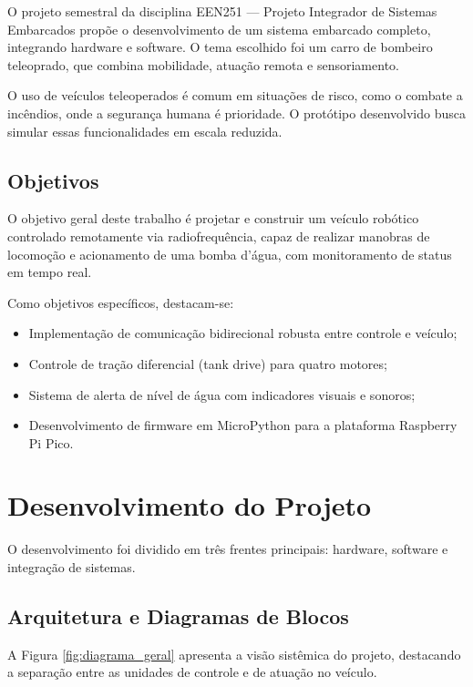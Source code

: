 \documentclass[
	12pt,				
	openright,			
	oneside,			
	a4paper,			
	english,			
	brazilian			
	]{abntex2}
\begin{document}
O projeto semestral da disciplina EEN251 --- Projeto Integrador de Sistemas Embarcados propõe o desenvolvimento de um sistema embarcado completo, integrando hardware e software. O tema escolhido foi um carro de bombeiro teleoprado, que combina mobilidade, atuação remota e sensoriamento.

O uso de veículos teleoperados é comum em situações de risco, como o combate a incêndios, onde a segurança humana é prioridade. O protótipo desenvolvido busca simular essas funcionalidades em escala reduzida.

\section{Objetivos}

O objetivo geral deste trabalho é projetar e construir um veículo robótico controlado remotamente via radiofrequência, capaz de realizar manobras de locomoção e acionamento de uma bomba d'água, com monitoramento de status em tempo real.

Como objetivos específicos, destacam-se:
\begin{itemize}
    \item Implementação de comunicação bidirecional robusta entre controle e veículo;
    \item Controle de tração diferencial (tank drive) para quatro motores;
    \item Sistema de alerta de nível de água com indicadores visuais e sonoros;
    \item Desenvolvimento de firmware em MicroPython para a plataforma Raspberry Pi Pico.
\end{itemize}

\chapter{Desenvolvimento do Projeto}

O desenvolvimento foi dividido em três frentes principais: hardware, software e integração de sistemas.

\section{Arquitetura e Diagramas de Blocos}

A Figura \ref{fig:diagrama_geral} apresenta a visão sistêmica do projeto, destacando a separação entre as unidades de controle e de atuação no veículo.
\end{document}
